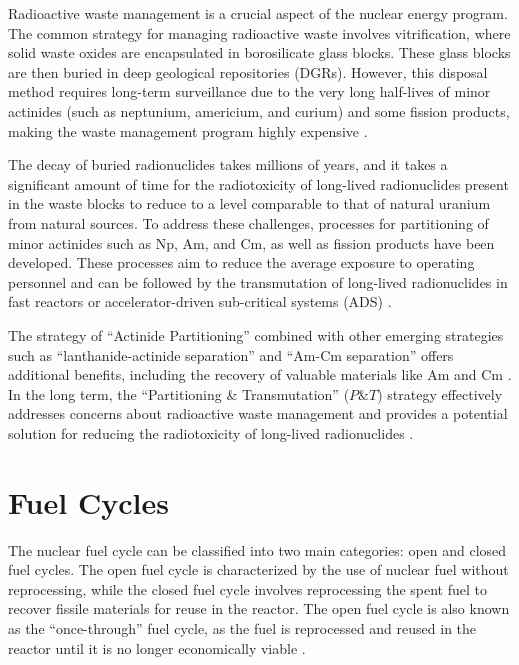 Radioactive waste management is a crucial aspect of the nuclear energy program. The common strategy for managing radioactive waste involves vitrification, where solid waste oxides are encapsulated in borosilicate glass blocks. These glass blocks are then buried in deep geological repositories (DGRs). However, this disposal method requires long-term surveillance due to the very long half-lives of minor actinides (such as neptunium, americium, and curium) and some fission products, making the waste management program highly expensive \cite{fuel_cycle_book}.

The decay of buried radionuclides takes millions of years, and it takes a significant amount of time for the radiotoxicity of long-lived radionuclides present in the waste blocks to reduce to a level comparable to that of natural uranium from natural sources\cite{fuel_cycle_book}. To address these challenges, processes for partitioning of minor actinides such as Np, Am, and Cm, as well as fission products have been developed. These processes aim to reduce the average exposure to operating personnel and can be followed by the transmutation of long-lived radionuclides in fast reactors or accelerator-driven sub-critical systems (ADS) \cite{fuel_cycle_book}.

The strategy of ``Actinide Partitioning'' combined with other emerging strategies such as ``lanthanide-actinide separation'' and ``Am-Cm separation'' offers additional benefits, including the recovery of valuable materials like Am and Cm \cite{fuel_cycle_book}. In the long term, the ``Partitioning \& Transmutation'' (\(P\&T\)) strategy effectively addresses concerns about radioactive waste management and provides a potential solution for reducing the radiotoxicity of long-lived radionuclides \cite{fuel_cycle_book}.

\section{Fuel Cycles}

The nuclear fuel cycle can be classified into two main categories: open and closed fuel cycles. The open fuel cycle is characterized by the use of nuclear fuel without reprocessing, while the closed fuel cycle involves reprocessing the spent fuel to recover fissile materials for reuse in the reactor. The open fuel cycle is also known as the ``once-through'' fuel cycle, as the fuel is reprocessed and reused in the reactor until it is no longer economically viable \cite{fuel_cycle_book}.

